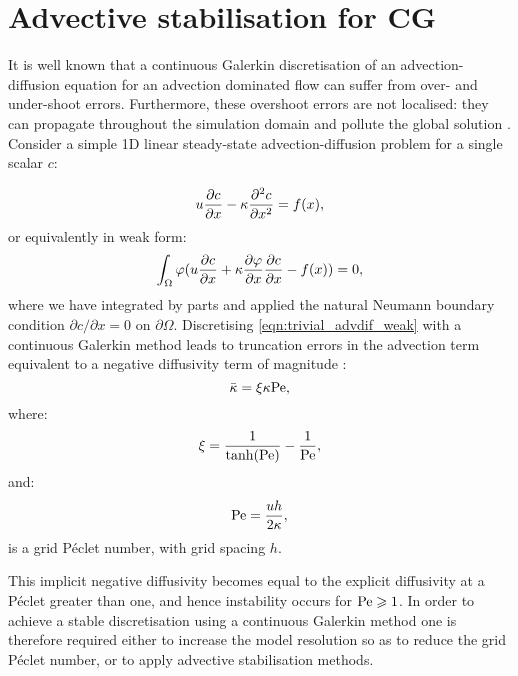 \section{Advective stabilisation for CG}
\label{Sect:ND_advective_stabilisation_CG}

It is well known that a continuous Galerkin discretisation of an
advection-diffusion equation for an advection dominated flow can suffer from
over- and under-shoot errors. Furthermore, these overshoot errors are not
localised: they can propagate throughout the simulation domain and pollute the
global solution \citep{hughes1987}. Consider a simple 1D linear steady-state
advection-diffusion problem for a single scalar $c$:

\begin{equation}\label{eqn:trivial_advdif}
  u \frac{\partial c}{\partial x} - \kappa \frac{\partial^2c}{\partial x^2} = f(x),
\end{equation}
or equivalently in weak form:
\begin{equation}\label{eqn:trivial_advdif_weak}
  \int_\Omega \varphi (u \frac{\partial c}{\partial x} + \kappa \frac{\partial\varphi}{\partial x} \frac{\partial c}{\partial x} - f(x)) = 0,
\end{equation}
where we have integrated by parts and applied the natural Neumann boundary
condition $\partial c / \partial x = 0$ on $\partial \Omega$.
Discretising \eqref{eqn:trivial_advdif_weak} with a continuous Galerkin method
leads to truncation errors in the advection term equivalent to a negative
diffusivity term of magnitude \citep{DoneaBook}:
\begin{equation}\label{eqn:cg_implicit_diffusivity}
  \bar{\kappa} = \xi \kappa \mathrm{Pe},
\end{equation}
where:
\begin{equation}\label{eqn:xi_parameter}
  \xi = \frac{1}{\tanh(\mathrm{Pe})} - \frac{1}{\mathrm{Pe}},
\end{equation}
and:
\begin{equation}\label{eqn:grid_pe}
  \mathrm{Pe} = \frac{u h}{2 \kappa},
\end{equation}
is a grid P\'eclet number, with grid spacing $h$.

This implicit negative diffusivity becomes
equal to the explicit diffusivity at a P\'eclet greater than one, and hence
instability occurs for $\mathrm{Pe} \geqslant 1$. In order to achieve a stable discretisation
using a continuous Galerkin method one is therefore required either to increase
the model resolution so as to reduce the grid P\'eclet number, or to apply
advective stabilisation methods.

